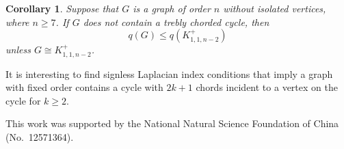 \documentclass[12pt]{article}
\newtheorem {corollary}{Corollary}[section]
\begin{document}
\begin{corollary} \label{RE}
Suppose that $G$ is  a graph of order  $n$ without isolated vertices, where $n\ge 7$.
If $G$ does not contain a trebly chorded cycle, then
\[
q(G)\le q(K_{1,1,n-2}^+)
\]
unless $G\cong K_{1,1,n-2}^+$.
\end{corollary}

It is interesting to find  signless Laplacian index conditions that imply a graph with fixed order
contains a cycle with $2k+1$ chords incident to a vertex on the cycle for $k\ge 2$.



\bigskip
\bigskip

This work was supported by the National Natural Science Foundation of China (No.~12571364).
\end{document}
